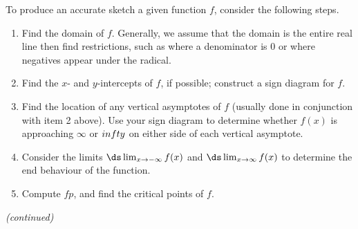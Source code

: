 \enlargethispage{2\baselineskip}
{}
{To produce an accurate sketch a given function $f$, consider the following steps.
\begin{enumerate}
\item		Find the domain of $f$. Generally, we assume that the domain is the entire real line then find restrictions, such as where a denominator is 0 or where negatives appear under the radical.
\item 		Find the $x$- and $y$-intercepts of $f$, if possible; construct a sign diagram for $f$.
\item		Find the location of any vertical asymptotes of $f$ (usually done in conjunction with item 2 above). Use your sign diagram to determine whether $f(x)$ is approaching $\infty$ or $\-infty$ on either side of each vertical asymptote.
\item		Consider the limits $\ds\lim_{x\to-\infty}f(x)$ and $\ds\lim_{x\to\infty}f(x)$ to determine the end behaviour of the function.
\item		Compute  $fp$, and find the critical points of $f$.
\end{enumerate}
\small\textit{(continued)}\normalsize
}
\addtocounter{keyideacounter}{-1}
